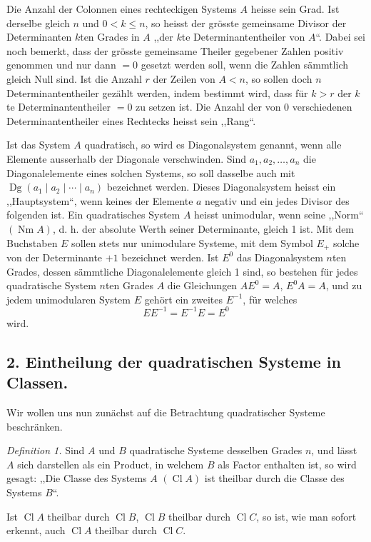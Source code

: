 \documentclass[11pt,a4paper]{article}
\newcommand{\Cl}{\operatorname{Cl}}
\newcommand{\Nm}{\operatorname{Nm}}
\newcommand{\Dg}{\operatorname{Dg}}
\begin{document}
Die Anzahl der Colonnen eines rechteckigen Systems $A$ heisse sein Grad. Ist derselbe gleich $n$ und $0<k\le n$, so heisst der grösste gemeinsame Divisor der Determinanten $k$ten Grades in $A$ ,,der $k$te Determinantentheiler von $A$``. Dabei sei noch bemerkt, dass der grösste gemeinsame Theiler gegebener Zahlen positiv genommen und nur dann $=0$ gesetzt werden soll, wenn die Zahlen sämmtlich gleich Null sind. Ist die Anzahl $r$ der Zeilen von $A<n$, so sollen doch $n$ Determinantentheiler gezählt werden, indem bestimmt wird, dass für $k>r$ der $k$te Determinantentheiler $=0$ zu setzen ist. Die Anzahl der von 0 verschiedenen Determinantentheiler eines Rechtecks heisst sein ,,Rang``.

Ist das System $A$ quadratisch, so wird es Diagonalsystem genannt, wenn alle Elemente ausserhalb der Diagonale verschwinden. Sind $a_1,a_2,\ldots,a_n$ die Diagonalelemente eines solchen Systems, so soll dasselbe auch mit $\Dg(a_1\mid a_2\mid\cdots\mid a_n)$ bezeichnet werden. Dieses Diagonalsystem heisst ein ,,Hauptsystem``, wenn keines der Elemente $a$ negativ und ein jedes Divisor des folgenden ist. Ein quadratisches System $A$ heisst unimodular, wenn seine ,,Norm`` $(\Nm A)$, d. h. der absolute Werth seiner Determinante, gleich 1 ist. Mit dem Buchstaben $E$ sollen stets nur unimodulare Systeme, mit dem Symbol $E_+$ solche von der Determinante $+1$ bezeichnet werden. Ist $E^0$ das Diagonalsystem $n$ten Grades, dessen sämmtliche Diagonalelemente gleich 1 sind, so bestehen für jedes quadratische System $n$ten Grades $A$ die Gleichungen $AE^0=A$, $E^0A=A$, und zu jedem unimodularen System $E$ gehört ein zweites $E^{-1}$, für welches
\[
EE^{-1}=E^{-1}E=E^0
\]
wird.

\subsection*{2. Eintheilung der quadratischen Systeme in Classen.}

Wir wollen uns nun zunächst auf die Betrachtung quadratischer Systeme beschränken.

\emph{Definition 1.} Sind $A$ und $B$ quadratische Systeme desselben Grades $n$, und lässt $A$ sich darstellen als ein Product, in welchem $B$ als Factor enthalten ist, so wird gesagt: ,,Die Classe des Systems $A$ $(\Cl A)$ ist theilbar durch die Classe des Systems $B$``.

Ist $\Cl A$ theilbar durch $\Cl B$, $\Cl B$ theilbar durch $\Cl C$, so ist, wie man sofort erkennt, auch $\Cl A$ theilbar durch $\Cl C$.
\end{document}
